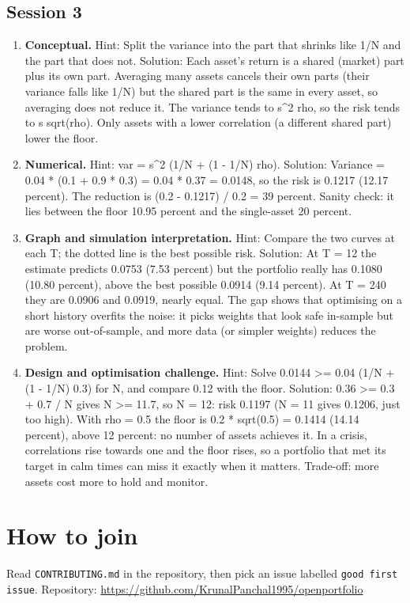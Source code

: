 \documentclass[11pt,a4paper]{article}
\begin{document}
\subsection*{Session 3}
\begin{enumerate}[nosep]
\item \textbf{Conceptual.} Hint: Split the variance into the part that shrinks like 1/N and the part that does not. Solution: Each asset's return is a shared (market) part plus its own part. Averaging many assets cancels their own parts (their variance falls like 1/N) but the shared part is the same in every asset, so averaging does not reduce it. The variance tends to s\textasciicircum{}2 rho, so the risk tends to s sqrt(rho). Only assets with a lower correlation (a different shared part) lower the floor.
\item \textbf{Numerical.} Hint: var = s\textasciicircum{}2 (1/N + (1 - 1/N) rho). Solution: Variance = 0.04 * (0.1 + 0.9 * 0.3) = 0.04 * 0.37 = 0.0148, so the risk is 0.1217 (12.17 percent). The reduction is (0.2 - 0.1217) / 0.2 = 39 percent. Sanity check: it lies between the floor 10.95 percent and the single-asset 20 percent.
\item \textbf{Graph and simulation interpretation.} Hint: Compare the two curves at each T; the dotted line is the best possible risk. Solution: At T = 12 the estimate predicts 0.0753 (7.53 percent) but the portfolio really has 0.1080 (10.80 percent), above the best possible 0.0914 (9.14 percent). At T = 240 they are 0.0906 and 0.0919, nearly equal. The gap shows that optimising on a short history overfits the noise: it picks weights that look safe in-sample but are worse out-of-sample, and more data (or simpler weights) reduces the problem.
\item \textbf{Design and optimisation challenge.} Hint: Solve 0.0144 \textgreater{}= 0.04 (1/N + (1 - 1/N) 0.3) for N, and compare 0.12 with the floor. Solution: 0.36 \textgreater{}= 0.3 + 0.7 / N gives N \textgreater{}= 11.7, so N = 12: risk 0.1197 (N = 11 gives 0.1206, just too high). With rho = 0.5 the floor is 0.2 * sqrt(0.5) = 0.1414 (14.14 percent), above 12 percent: no number of assets achieves it. In a crisis, correlations rise towards one and the floor rises, so a portfolio that met its target in calm times can miss it exactly when it matters. Trade-off: more assets cost more to hold and monitor.
\end{enumerate}

\section{How to join}
Read \texttt{CONTRIBUTING.md} in the repository, then pick an issue labelled \texttt{good first issue}. Repository: \url{https://github.com/KrunalPanchal1995/openportfolio}
\end{document}
